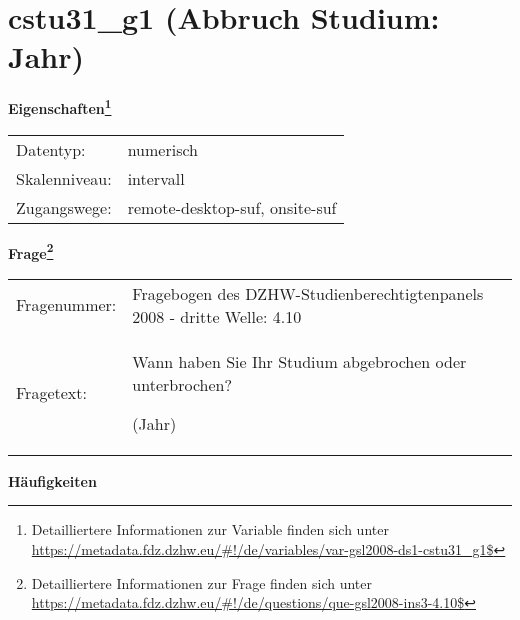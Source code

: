 
    \setcounter{footnote}{0}

    \vspace*{-1.8cm}
	\section{cstu31\_g1 (Abbruch Studium: Jahr)}
	\label{section:cstu31_g1}



    \vspace*{0.5cm}
    \noindent\textbf{Eigenschaften\footnote{Detailliertere Informationen zur Variable finden sich unter
		\url{https://metadata.fdz.dzhw.eu/\#!/de/variables/var-gsl2008-ds1-cstu31_g1$}}}\\
	\begin{tabularx}{\hsize}{@{}lX}
	Datentyp: & numerisch \\
	Skalenniveau: & intervall \\
	Zugangswege: &
	  remote-desktop-suf, 
	  onsite-suf
 \\
    \end{tabularx}



				\vspace*{0.5cm}
                \noindent\textbf{Frage\footnote{Detailliertere Informationen zur Frage finden sich unter
		              \url{https://metadata.fdz.dzhw.eu/\#!/de/questions/que-gsl2008-ins3-4.10$}}}\\
				\begin{tabularx}{\hsize}{@{}lX}
					Fragenummer: &
					  Fragebogen des DZHW-Studienberechtigtenpanels 2008 - dritte Welle:
					  4.10
 \\
					Fragetext: & Wann haben Sie Ihr Studium abgebrochen oder unterbrochen?\par  (Jahr) \\
				\end{tabularx}





        		\vspace*{0.5cm}
                \noindent\textbf{Häufigkeiten}

